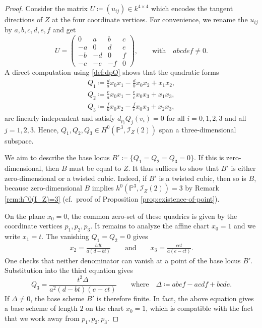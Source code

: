 \documentclass[a4paper,11pt]{amsart}
\numberwithin{equation}{section}
\theoremstyle{definition}
\theoremstyle{remark}
\newcommand{\PP}{\mathbb P}
\newcommand{\CP}{\PP}
\begin{document}
\begin{proof}
Consider the matrix $U\coloneq(u_{ij})\in k^{4\times 4}$ which encodes the tangent directions of $Z$ at the four coordinate vertices.
For convenience, we rename the $u_{ij}$ by $a,b,c,d,e,f$ and get 
\[
  U=\begin{pmatrix}
  0&a&b&c\\
  -a&0&d&e\\
  -b&-d&0&f\\
  -c&-e&-f&0
  \end{pmatrix}, \qquad \text{with}\quad abcdef\ne 0.
\] 
A direct computation using \eqref{def:dpQ} shows that the quadratic forms
\begin{align*}
  Q_1\coloneq \frac da x_0x_1-\frac db x_0x_2+x_1x_2,\\
  Q_2\coloneq \frac ea x_0x_1-\frac ec x_0x_3+x_1x_3,\\
  Q_3\coloneq \frac fb x_0x_2-\frac fc x_0x_3+x_2x_3,
\end{align*}
are linearly independent and satisfy $d_{p_i}Q_j(v_i)=0$ for all $i=0,1,2,3$ and all $j=1,2,3$.
Hence, $Q_1,Q_2,Q_3\in H^0(\CP^3,\mathcal I_Z(2))$ span a three-dimensional subspace.

We aim to describe the base locus $B'\coloneq \{Q_1=Q_2=Q_3=0\}$.
If this is zero-dimensional, then $B$ must be equal to $Z$.
It thus suffices to show that $B'$ is either zero-dimensional or a twisted cubic.
Indeed, if $B'$ is a twisted cubic, then so is $B$, because zero-dimensional $B$ implies $h^0(\CP^3,\mathcal I_Z(2))=3$ by Remark \ref{rem:h^0(I_Z)=3} (cf.~proof of Proposition \ref{prop:existence-of-point}). 

On the plane $x_0=0$, the common zero-set of these quadrics is given by the coordinate vertices $p_1,p_2,p_3$.
It remains to analyze the affine chart $x_0=1$ and we write $x_1=t$.
The vanishing $Q_1=Q_2=0$ gives 
\begin{align} \label{eq:x2-x3}
  x_2=\frac{bdt}{a(d-bt)}\qquad \text{and} \qquad 
  x_3=\frac{cet}{a(e-ct)}.
\end{align}
One checks that neither denominator can vanish at a point of the base locus $B'$.
Substitution into the third equation gives
\[
 Q_3=\frac{t^2\Delta}{a^2(d-bt)(e-ct)}\qquad \text{where}\quad \Delta\coloneq abef-acdf+bcde.
\]
If $\Delta\ne 0$, the base scheme $B'$ is therefore finite.
In fact, the above equation gives a base scheme of length $2$ on the chart $x_0=1$, which is compatible with the fact that we work away from $p_1,p_2,p_3$.


\end{proof}
\end{document}
